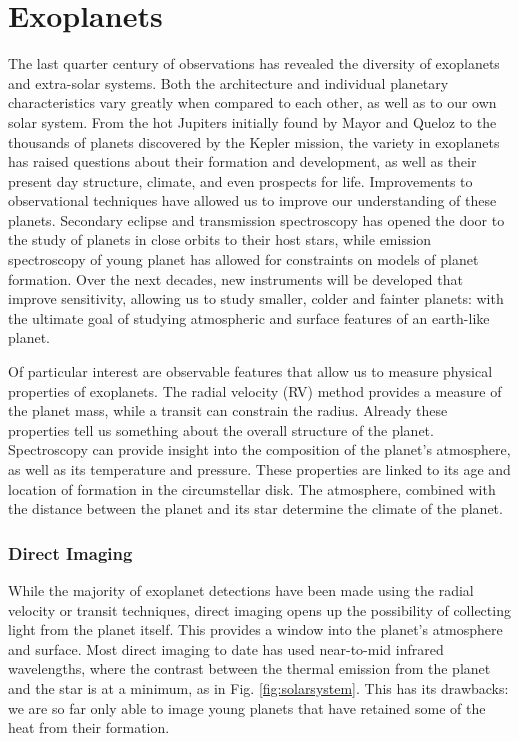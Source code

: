 \section{Exoplanets}
The last quarter century of observations has revealed the diversity of exoplanets and extra-solar systems.
Both the architecture and individual planetary characteristics vary greatly when compared to each other, as well as to our own solar system.
From the hot Jupiters initially found by Mayor and Queloz \parencite{Mayor1995} to the thousands of planets discovered by the Kepler mission, the variety in exoplanets has raised questions about their formation and development, as well as their present day structure, climate, and even prospects for life.
Improvements to observational techniques have allowed us to improve our understanding of these planets.
Secondary eclipse and transmission spectroscopy has opened the door to the study of planets in close orbits to their host stars, while emission spectroscopy of young planet has allowed for constraints on models of planet formation.
Over the next decades, new instruments will be developed that improve sensitivity, allowing us to study smaller, colder and fainter planets: with the ultimate goal of studying atmospheric and surface features of an earth-like planet.

Of particular interest are observable features that allow us to measure physical properties of exoplanets.
The radial velocity (RV) method provides a measure of the planet mass, while a transit can constrain the radius.
Already these properties tell us something about the overall structure of the planet.
Spectroscopy can provide insight into the composition of the planet's atmosphere, as well as its temperature and pressure.
These properties are linked to its age and location of formation in the circumstellar disk.
The atmosphere, combined with the distance between the planet and its star determine the climate of the planet.

\subsubsection{Direct Imaging}
While the majority of exoplanet detections have been made using the radial velocity or transit techniques, direct imaging opens up the possibility of collecting light from the planet itself.
This provides a window into the planet's atmosphere and surface.
Most direct imaging to date has used near-to-mid infrared wavelengths, where the contrast between the thermal emission from the planet and the star is at a minimum, as in Fig. \ref{fig:solarsystem}.
This has its drawbacks: we are so far only able to image young planets that have retained some of the heat from their formation.
 
